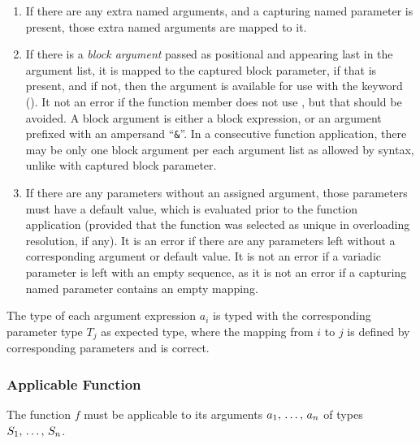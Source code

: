 \begin{enumerate}
  \item If there are any extra named arguments, and a capturing named parameter is present, those extra named arguments are mapped to it. 
  
  \item If there is a {\em block argument} passed as positional and appearing last in the argument list, it is mapped to the captured block parameter, if that is present, and if not, then the argument is available for use with the  keyword (). It not an error if the function member does not use , but that should be avoided. A block argument is either a block expression, or an argument prefixed with an ampersand ``\lstinline!&!''. In a consecutive function application, there may be only one block argument per each argument list as allowed by syntax, unlike with captured block parameter. 
  
  \item If there are any parameters without an assigned argument, those parameters must have a default value, which is evaluated prior to the function application (provided that the function was selected as unique in overloading resolution, if any). It is an error if there are any parameters left without a corresponding argument or default value. It is not an error if a variadic parameter is left with an empty sequence, as it is not an error if a capturing named parameter contains an empty mapping. 
  
\end{enumerate}

The type of each argument expression $a_i$ is typed with the corresponding parameter type $T_j$ as expected type, where the mapping from $i$ to $j$ is defined by corresponding parameters and is correct. 






\subsubsection{Applicable Function}

The function $f$ must be applicable to its arguments $a_1 ,\, \ldots ,\, a_n$ of types $S_1 ,\, \ldots ,\, S_n$. 

